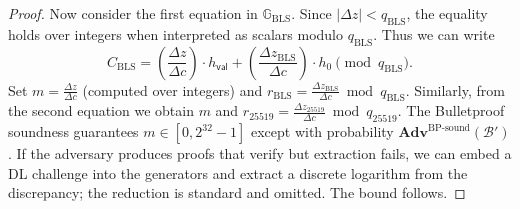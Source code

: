 \documentclass[11pt]{article}
\theoremstyle{definitionstyle}
\theoremstyle{plain}
\newcommand{\advantage}[1]{\mathbf{Adv}^{\mathrm{#1}}}
\begin{document}
\begin{proof}
Now consider the first equation in $\mathbb{G}_{\text{BLS}}$. Since $|\Delta z| < q_{\text{BLS}}$, the equality holds over integers when interpreted as scalars modulo $q_{\text{BLS}}$. Thus we can write
\[
C_{\text{BLS}} = \left(\frac{\Delta z}{\Delta c}\right) \cdot h_{\mathsf{val}} + \left(\frac{\Delta z_{\text{BLS}}}{\Delta c}\right) \cdot h_0 \pmod{q_{\text{BLS}}}.
\]
Set $m = \frac{\Delta z}{\Delta c}$ (computed over integers) and $r_{\text{BLS}} = \frac{\Delta z_{\text{BLS}}}{\Delta c} \bmod q_{\text{BLS}}$. Similarly, from the second equation we obtain $m$ and $r_{25519} = \frac{\Delta z_{25519}}{\Delta c} \bmod q_{25519}$. The Bulletproof soundness guarantees $m \in [0,2^{32}-1]$ except with probability $\advantage{BP\text{-}sound}(\mathcal{B}')$. If the adversary produces proofs that verify but extraction fails, we can embed a DL challenge into the generators and extract a discrete logarithm from the discrepancy; the reduction is standard and omitted. The bound follows.
\end{proof}
\end{document}
